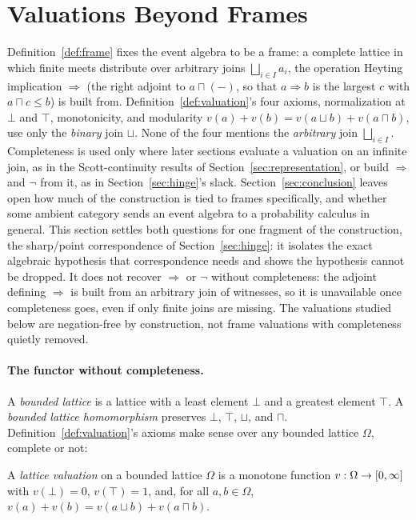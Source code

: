 \section{Valuations Beyond Frames}
\label{sec:lattice}

Definition~\ref{def:frame} fixes the event algebra to be a frame: a
complete lattice in which finite meets distribute over arbitrary
joins $\bigsqcup_{i \in I} a_i$, the operation Heyting implication
$\Rightarrow$ (the right adjoint to $a \sqcap (-)$, so that $a \Rightarrow b$ is the largest $c$ with $a \sqcap c \le b$) is built from.
Definition~\ref{def:valuation}'s four axioms, normalization at
$\bot$ and $\top$, monotonicity, and modularity
$v(a) + v(b) = v(a \sqcup b) + v(a \sqcap b)$, use only the
\emph{binary} join $\sqcup$. None of the four mentions the
\emph{arbitrary} join $\bigsqcup_{i \in I}$. Completeness is used
only where later sections evaluate a valuation on an infinite join,
as in the Scott-continuity results of
Section~\ref{sec:representation}, or build $\Rightarrow$ and $\neg$
from it, as in Section~\ref{sec:hinge}'s slack.
Section~\ref{sec:conclusion} leaves open how much of the
construction is tied to frames specifically, and whether some
ambient category sends an event algebra to a probability calculus
in general. This section settles both questions for one fragment of
the construction, the sharp/point correspondence of
Section~\ref{sec:hinge}: it isolates the exact algebraic hypothesis
that correspondence needs and shows the hypothesis cannot be
dropped. It does not recover $\Rightarrow$ or $\neg$ without
completeness: the adjoint defining $\Rightarrow$ is built from an
arbitrary join of witnesses, so it is unavailable once completeness
goes, even if only finite joins are missing. The valuations studied
below are negation-free by construction, not frame valuations with
completeness quietly removed.

\paragraph{The functor without completeness.}
A \emph{bounded lattice} is a lattice with a least element $\bot$
and a greatest element $\top$. A \emph{bounded lattice homomorphism}
preserves $\bot$, $\top$, $\sqcup$, and $\sqcap$.
Definition~\ref{def:valuation}'s axioms make sense over any bounded
lattice $\Omega$, complete or not:

\begin{definition}
\label{def:lvaluation}
A \emph{lattice valuation} on a bounded lattice $\Omega$ is a
monotone function $v : \Omega \to [0,\infty]$ with $v(\bot) = 0$,
$v(\top) = 1$, and, for all $a, b \in \Omega$,
$v(a) + v(b) = v(a \sqcup b) + v(a \sqcap b)$.
\end{definition}

